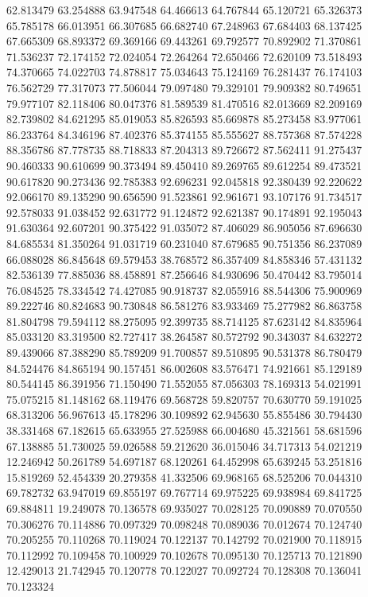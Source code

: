62.813479
63.254888
63.947548
64.466613
64.767844
65.120721
65.326373
65.785178
66.013951
66.307685
66.682740
67.248963
67.684403
68.137425
67.665309
68.893372
69.369166
69.443261
69.792577
70.892902
71.370861
71.536237
72.174152
72.024054
72.264264
72.650466
72.620109
73.518493
74.370665
74.022703
74.878817
75.034643
75.124169
76.281437
76.174103
76.562729
77.317073
77.506044
79.097480
79.329101
79.909382
80.749651
79.977107
82.118406
80.047376
81.589539
81.470516
82.013669
82.209169
82.739802
84.621295
85.019053
85.826593
85.669878
85.273458
83.977061
86.233764
84.346196
87.402376
85.374155
85.555627
88.757368
87.574228
88.356786
87.778735
88.718833
87.204313
89.726672
87.562411
91.275437
90.460333
90.610699
90.373494
89.450410
89.269765
89.612254
89.473521
90.617820
90.273436
92.785383
92.696231
92.045818
92.380439
92.220622
92.066170
89.135290
90.656590
91.523861
92.961671
93.107176
91.734517
92.578033
91.038452
92.631772
91.124872
92.621387
90.174891
92.195043
91.630364
92.607201
90.375422
91.035072
87.406029
86.905056
87.696630
84.685534
81.350264
91.031719
60.231040
87.679685
90.751356
86.237089
66.088028
86.845648
69.579453
38.768572
86.357409
84.858346
57.431132
82.536139
77.885036
88.458891
87.256646
84.930696
50.470442
83.795014
76.084525
78.334542
74.427085
90.918737
82.055916
88.544306
75.900969
89.222746
80.824683
90.730848
86.581276
83.933469
75.277982
86.863758
81.804798
79.594112
88.275095
92.399735
88.714125
87.623142
84.835964
85.033120
83.319500
82.727417
38.264587
80.572792
90.343037
84.632272
89.439066
87.388290
85.789209
91.700857
89.510895
90.531378
86.780479
84.524476
84.865194
90.157451
86.002608
83.576471
74.921661
85.129189
80.544145
86.391956
71.150490
71.552055
87.056303
78.169313
54.021991
75.075215
81.148162
68.119476
69.568728
59.820757
70.630770
59.191025
68.313206
56.967613
45.178296
30.109892
62.945630
55.855486
30.794430
38.331468
67.182615
65.633955
27.525988
66.004680
45.321561
58.681596
67.138885
51.730025
59.026588
59.212620
36.015046
34.717313
54.021219
12.246942
50.261789
54.697187
68.120261
64.452998
65.639245
53.251816
15.819269
52.454339
20.279358
41.332506
69.968165
68.525206
70.044310
69.782732
63.947019
69.855197
69.767714
69.975225
69.938984
69.841725
69.884811
19.249078
70.136578
69.935027
70.028125
70.090889
70.070550
70.306276
70.114886
70.097329
70.098248
70.089036
70.012674
70.124740
70.205255
70.110268
70.119024
70.122137
70.142792
70.021900
70.118915
70.112992
70.109458
70.100929
70.102678
70.095130
70.125713
70.121890
12.429013
21.742945
70.120778
70.122027
70.092724
70.128308
70.136041
70.123324
